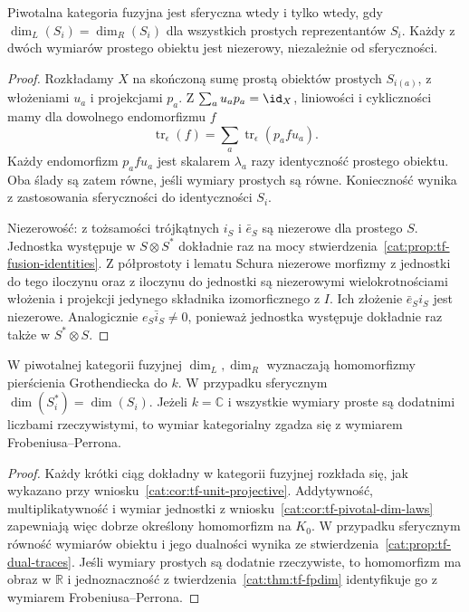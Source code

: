 \begin{twierdzenie}\label{cat:thm:tf-spherical-simple}
Piwotalna kategoria fuzyjna jest sferyczna wtedy i tylko wtedy, gdy $\dim_L(S_i)=\dim_R(S_i)$ dla wszystkich prostych reprezentantów $S_i$. Każdy z dwóch wymiarów prostego obiektu jest niezerowy, niezależnie od sferyczności.
\end{twierdzenie}
\begin{proof}
Rozkładamy $X$ na skończoną sumę prostą obiektów prostych $S_{i(a)}$, z włożeniami $u_a$ i projekcjami $p_a$. Z $\sum_a u_ap_a=\id_X$, liniowości i cykliczności mamy dla dowolnego endomorfizmu $f$
\[
 \operatorname{tr}_{\epsilon}(f)
 =\sum_a\operatorname{tr}_{\epsilon}(p_afu_a).
\]
Każdy endomorfizm $p_afu_a$ jest skalarem $\lambda_a$ razy identyczność prostego obiektu. Oba ślady są zatem równe, jeśli wymiary prostych są równe. Konieczność wynika z zastosowania sferyczności do identyczności $S_i$.

Niezerowość: z tożsamości trójkątnych $i_S$ i $\bar e_S$ są niezerowe dla prostego $S$. Jednostka występuje w $S\otimes S^*$ dokładnie raz na mocy stwierdzenia~\ref{cat:prop:tf-fusion-identities}. Z półprostoty i lematu Schura niezerowe morfizmy z jednostki do tego iloczynu oraz z iloczynu do jednostki są niezerowymi wielokrotnościami włożenia i projekcji jedynego składnika izomorficznego z $I$. Ich złożenie $\bar e_S i_S$ jest niezerowe. Analogicznie $e_S\bar i_S\neq0$, ponieważ jednostka występuje dokładnie raz także w $S^*\otimes S$.
\end{proof}

\begin{wniosek}\label{cat:cor:tf-dimension-ring}
W piwotalnej kategorii fuzyjnej $\dim_L,\dim_R$ wyznaczają homomorfizmy pierścienia Grothendiecka do $k$. W przypadku sferycznym $\dim(S_i^*)=\dim(S_i)$. Jeżeli $k=\mathbb C$ i wszystkie wymiary proste są dodatnimi liczbami rzeczywistymi, to wymiar kategorialny zgadza się z wymiarem Frobeniusa--Perrona.
\end{wniosek}
\begin{proof}
Każdy krótki ciąg dokładny w kategorii fuzyjnej rozkłada się, jak wykazano przy wniosku~\ref{cat:cor:tf-unit-projective}. Addytywność, multiplikatywność i wymiar jednostki z wniosku~\ref{cat:cor:tf-pivotal-dim-laws} zapewniają więc dobrze określony homomorfizm na $K_0$. W przypadku sferycznym równość wymiarów obiektu i jego dualności wynika ze stwierdzenia~\ref{cat:prop:tf-dual-traces}. Jeśli wymiary prostych są dodatnie rzeczywiste, to homomorfizm ma obraz w $\mathbb R$ i jednoznaczność z twierdzenia~\ref{cat:thm:tf-fpdim} identyfikuje go z wymiarem Frobeniusa--Perrona.
\end{proof}


